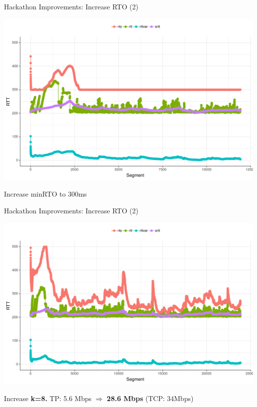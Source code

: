 \begin{frame}[fragile]{Hackathon Improvements: Increase RTO (2)}

\includegraphics[width=\linewidth]{images/rtt_rto300ms.png}

Increase minRTO to 300ms

\end{frame}


\begin{frame}[fragile]{Hackathon Improvements: Increase RTO (2)}

\includegraphics[width=\linewidth]{images/rtt_k8.png}

Increase \textbf{k=8.} 
TP:  5.6 Mbps $\Rightarrow$ \textbf{28.6 Mbps} (TCP: 34Mbps)

\end{frame}



